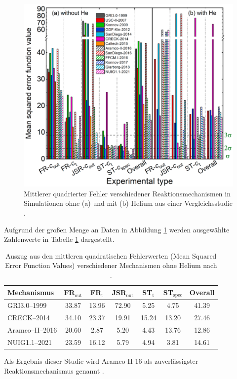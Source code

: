             \begin{figure}[H]
                \centering
                \includegraphics[width=0.65\linewidth]{img/sonstiges/Mechanismusvergleich_Zhang.png}
                \caption{Mittlerer quadrierter Fehler verschiedener Reaktionsmechanismen in Simulationen ohne (a) und mit (b) Helium aus einer Vergleichsstudie \cite{ZHANG2025114499}.}
                \label{fig:mechanismusvergleich_zhang}
            \end{figure} 
            Aufgrund der großen Menge an Daten in Abbildung \ref{fig:mechanismusvergleich_zhang} werden ausgewählte Zahlenwerte in Tabelle \ref{tab:zhang_mechanismen_auszug} dargestellt.
            \begin{table}[H]
                \centering
                \caption{Auszug aus den mittleren quadratischen Fehlerwerten (Mean Squared Error Function Values) verschiedener Mechanismen ohne Helium nach \textcite{ZHANG2025114499}.}
                \begin{tabular}{lcccccc}
                \toprule
                Mechanismus & FR$_\text{out}$ & FR$_\text{t}$ & JSR$_\text{out}$ & ST$_\text{t}$ & ST$_\text{spec}$ & Overall \\
                \midrule
                GRI3.0--1999   & 33.87 & 13.96 & 72.90 & 5.25 & 4.75 & 41.39 \\
                CRECK--2014    & 34.10 & 23.37 & 19.91 & 15.24 & 13.20 & 27.46 \\
                Aramco--II--2016 & 20.60 & 2.87 & 5.20 & 4.43 & 13.76 & 12.86 \\
                NUIG1.1--2021  & 23.59 & 16.12 & 5.79 & 4.94 & 3.81 & 14.61 \\
                \bottomrule
                \end{tabular}
                \label{tab:zhang_mechanismen_auszug}
            \end{table}
            Als Ergebnis dieser Studie wird Aramco-II-16 als zuverlässigster Reaktionsmechanismus genannt \cite{ZHANG2025114499}. 

